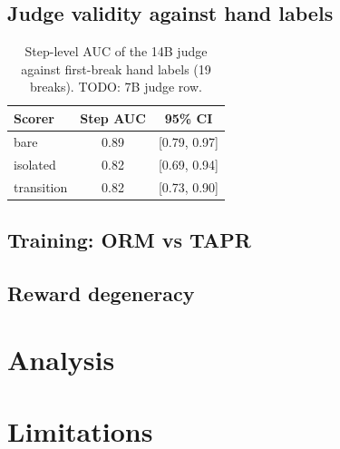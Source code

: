 \documentclass[11pt]{article}
\begin{document}
\subsection{Judge validity against hand labels}
\begin{table}[t]
\centering
\small
\begin{tabular}{lcc}
\toprule
Scorer & Step AUC & 95\% CI \\
\midrule
bare       & 0.89 & [0.79, 0.97] \\
isolated   & 0.82 & [0.69, 0.94] \\
transition & 0.82 & [0.73, 0.90] \\
\bottomrule
\end{tabular}
\caption{Step-level AUC of the 14B judge against first-break hand labels
(19 breaks). TODO: 7B judge row.}
\label{tab:judge}
\end{table}

\subsection{Training: ORM vs TAPR}

\subsection{Reward degeneracy}

\section{Analysis}

\section*{Limitations}
\end{document}
